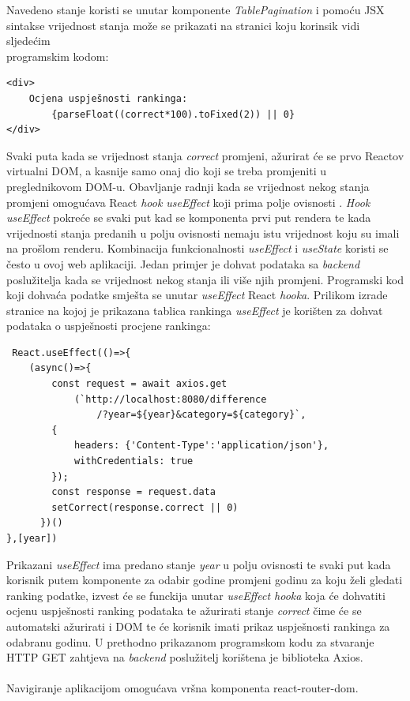 \documentclass[times, utf8, zavrsni]{fer}
\begin{document}
Navedeno stanje koristi se unutar komponente \emph{TablePagination} i pomoću JSX sintakse vrijednost stanja može se prikazati na stranici koju korinsik vidi sljedećim \\programskim kodom:
\begin{verbatim}
<div>
    Ocjena uspješnosti rankinga: 
        {parseFloat((correct*100).toFixed(2)) || 0}
</div>
\end{verbatim}
Svaki puta kada se vrijednost stanja \emph{correct} promjeni, ažurirat će se prvo Reactov virtualni DOM, a kasnije samo onaj dio koji se treba promjeniti u preglednikovom DOM-u.
Obavljanje radnji kada se vrijednost nekog stanja promjeni omogućava React \emph{hook useEffect} koji prima polje ovisnosti . \emph{Hook useEffect}
pokreće se svaki put kad se komponenta prvi put rendera te kada vrijednosti stanja predanih u polju ovisnosti nemaju istu vrijednost koju su imali na prošlom renderu.
Kombinacija funkcionalnosti \emph{useEffect} i \emph{useState} koristi se često u ovoj web aplikaciji. Jedan primjer je dohvat podataka sa \emph{backend} poslužitelja 
kada se vrijednost nekog stanja ili više njih promjeni. Programski kod koji dohvaća podatke smješta se unutar \emph{useEffect} React \emph{hooka}.
Prilikom izrade stranice na kojoj je prikazana tablica rankinga \emph{useEffect} je korišten za dohvat podataka o uspješnosti procjene rankinga:
\begin{verbatim}
 React.useEffect(()=>{
    (async()=>{
        const request = await axios.get
            (`http://localhost:8080/difference
                /?year=${year}&category=${category}`,
        {
            headers: {'Content-Type':'application/json'},
            withCredentials: true
        });
        const response = request.data
        setCorrect(response.correct || 0)
      })()
},[year])
\end{verbatim}
Prikazani \emph{useEffect} ima predano stanje \emph{year} u polju ovisnosti te svaki put kada korisnik putem komponente za odabir godine promjeni 
godinu za koju želi gledati ranking podatke, izvest će se funckija unutar \emph{useEffect hooka} koja će dohvatiti ocjenu uspješnosti ranking podataka te ažurirati stanje 
\emph{correct} čime će se automatski ažurirati i DOM te će korisnik imati prikaz uspješnosti rankinga za odabranu godinu.
U prethodno prikazanom programskom kodu za stvaranje HTTP GET zahtjeva na \emph{backend} poslužitelj korištena je biblioteka Axios.
\\\\Navigiranje aplikacijom omogućava vršna komponenta react-router-dom.
\end{document}
